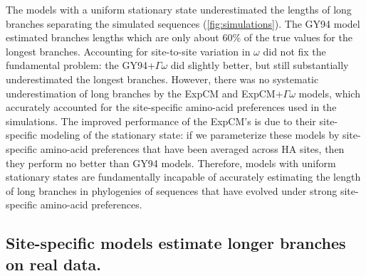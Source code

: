 \documentclass[11pt]{article}
\begin{document}
The models with a uniform stationary state underestimated the lengths of long branches separating the simulated sequences (\ref{fig:simulations}). 
The GY94 model estimated branches lengths which are only about 60\% of the true values for the longest branches. 
Accounting for site-to-site variation in $\omega$ did not fix the fundamental problem: the GY94+$\Gamma\omega$ did slightly better, but still substantially underestimated the longest branches.
However, there was no systematic underestimation of long branches by the ExpCM and ExpCM+$\Gamma\omega$ models, which accurately accounted for the site-specific amino-acid preferences used in the simulations.
The improved performance of the ExpCM's is due to their site-specific modeling of the stationary state: if we parameterize these models by site-specific amino-acid preferences that have been averaged across HA sites, then they perform no better than GY94 models.
Therefore, models with uniform stationary states are fundamentally incapable of accurately estimating the length of long branches in phylogenies of sequences that have evolved under strong site-specific amino-acid preferences.


\subsection*{Site-specific models estimate longer branches on real data.}
\end{document}
